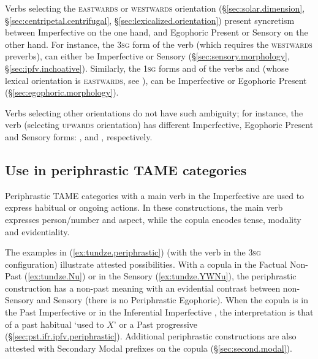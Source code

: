  Verbs selecting the \textsc{eastwards} or \textsc{westwards} orientation (§\ref{sec:solar.dimension}, §\ref{sec:centripetal.centrifugal}, §\ref{sec:lexicalized.orientation}) present syncretism between Imperfective on the one hand, and Egophoric Present or Sensory on the other hand. For instance, the \textsc{3sg}\flobv{} form  of the verb  (which requires the \textsc{westwards} preverbs), can either be Imperfective or Sensory (§\ref{sec:sensory.morphology}, §\ref{sec:ipfv.inchoative}). Similarly, the \textsc{1sg} forms  and  of the verbs  and  (whose lexical orientation is \textsc{eastwards}, see ), can be Imperfective or Egophoric Present (§\ref{sec:egophoric.morphology}).
 
 Verbs selecting other orientations do not have such ambiguity; for instance, the verb  (selecting \textsc{upwards} orientation) has different Imperfective, Egophoric Present and Sensory forms: ,  and , respectively.

\subsection{Use in periphrastic TAME categories} \label{sec:ipfv.periphrastic.TAME}
Periphrastic TAME categories with a main verb in the Imperfective are used to express habitual or ongoing actions. In these constructions, the main verb expresses person/number and aspect, while the copula encodes tense, modality and evidentiality.

The examples in (\ref{ex:tundze.periphrastic}) (with the verb  in the \textsc{3sg}\flobv{} configuration) illustrate attested possibilities. With a copula in the Factual Non-Past  (\ref{ex:tundze.Nu}) or in the Sensory  (\ref{ex:tundze.YWNu}), the periphrastic construction has a non-past meaning with an evidential contrast between non-Sensory and Sensory (there is no Periphrastic Egophoric). When the copula is in the Past Imperfective  or in the Inferential Imperfective , the interpretation is that of a past habitual `used to $X$' or a Past progressive (§\ref{sec:pst.ifr.ipfv.periphrastic}). Additional periphrastic constructions are also attested with Secondary Modal prefixes on the copula (§\ref{sec:second.modal}).

